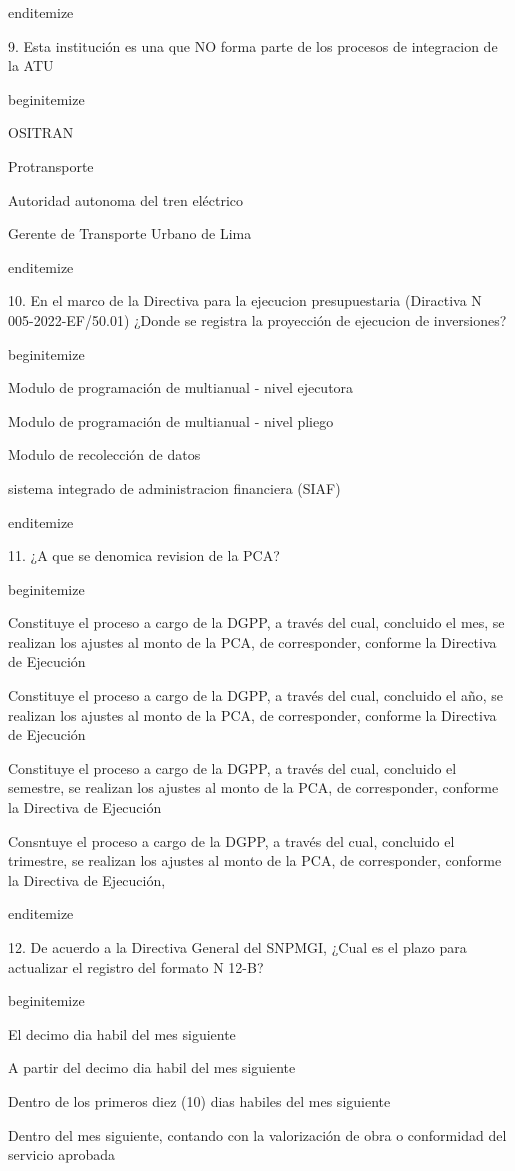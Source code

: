 end{itemize}

9. Esta institución es una que NO forma parte de los procesos de integracion de la ATU

begin{itemize}
			\item OSITRAN
			\item Protransporte
			\item Autoridad autonoma del tren eléctrico 
			\item Gerente de Transporte Urbano de Lima

end{itemize}

10. En el marco de la Directiva para la ejecucion presupuestaria (Diractiva N 005-2022-EF/50.01) ¿Donde se registra la proyección de ejecucion de inversiones?

begin{itemize}
			\item Modulo de programación de multianual - nivel ejecutora
			\item Modulo de programación de multianual - nivel pliego 
			\item Modulo de recolección de datos 
			\item sistema integrado de administracion financiera (SIAF)

end{itemize}

11. ¿A que se denomica revision de la PCA?

begin{itemize}
			\item Constituye el proceso a cargo de la DGPP, a través del cual, concluido el mes, se realizan los ajustes al monto de la PCA, de corresponder, conforme la Directiva de Ejecución 
			\item Constituye el proceso a cargo de la DGPP, a través del cual, concluido el año, se realizan los ajustes al monto de la PCA, de corresponder, conforme la Directiva de Ejecución
			\item Constituye el proceso a cargo de la DGPP, a través del cual, concluido el semestre, se realizan los ajustes al monto de la PCA, de corresponder, conforme la Directiva de Ejecución
			\item Consntuye el proceso a cargo de la DGPP, a través del cual, concluido el trimestre, se realizan los ajustes al monto de la PCA, de corresponder, conforme la Directiva de Ejecución, 

end{itemize}

12. De acuerdo a la Directiva General del SNPMGI, ¿Cual es el plazo para actualizar el registro del formato N 12-B? 

begin{itemize}
			\item El decimo dia habil del mes siguiente
			\item A partir del decimo dia habil del mes siguiente
			\item Dentro de los primeros diez (10) dias habiles del mes siguiente
			\item Dentro del mes siguiente, contando con la valorización de obra o conformidad del servicio aprobada

